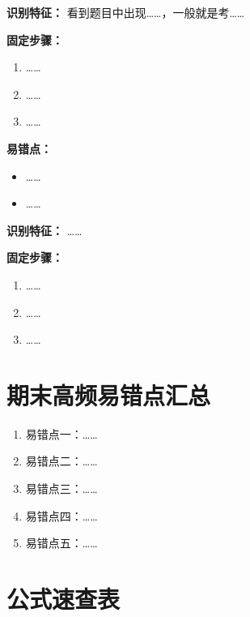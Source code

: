 \documentclass[UTF8,zihao=-4]{ctexart}
\begin{document}
\begin{methodbox}
\textbf{识别特征：}
看到题目中出现……，一般就是考……

\textbf{固定步骤：}
\begin{enumerate}
  \item ……
  \item ……
  \item ……
\end{enumerate}

\textbf{易错点：}
\begin{itemize}
  \item ……
  \item ……
\end{itemize}
\end{methodbox}

\begin{methodbox}
\textbf{识别特征：}
……

\textbf{固定步骤：}
\begin{enumerate}
  \item ……
  \item ……
  \item ……
\end{enumerate}
\end{methodbox}

\section{期末高频易错点汇总}

\begin{warnbox}[一页核心易错点]
\begin{enumerate}
  \item 易错点一：……
  \item 易错点二：……
  \item 易错点三：……
  \item 易错点四：……
  \item 易错点五：……
\end{enumerate}
\end{warnbox}

\section{公式速查表}
\end{document}
